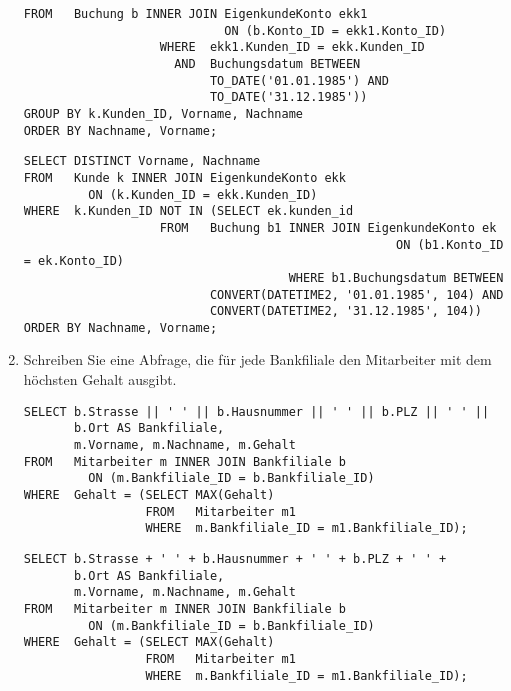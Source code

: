 \begin{enumerate}
\begin{lstlisting}[language=oracle_sql]
                   FROM   Buchung b INNER JOIN EigenkundeKonto ekk1
                            ON (b.Konto_ID = ekk1.Konto_ID)
                   WHERE  ekk1.Kunden_ID = ekk.Kunden_ID
                     AND  Buchungsdatum BETWEEN
                          TO_DATE('01.01.1985') AND
                          TO_DATE('31.12.1985'))
GROUP BY k.Kunden_ID, Vorname, Nachname
ORDER BY Nachname, Vorname;
        \end{lstlisting}
\clearpage
        \begin{mssql}[\FALSE]
        \end{mssql}
        \begin{lstlisting}[language=ms_sql]
SELECT DISTINCT Vorname, Nachname
FROM   Kunde k INNER JOIN EigenkundeKonto ekk
         ON (k.Kunden_ID = ekk.Kunden_ID)
WHERE  k.Kunden_ID NOT IN (SELECT ek.kunden_id
                   FROM   Buchung b1 INNER JOIN EigenkundeKonto ek
													ON (b1.Konto_ID = ek.Konto_ID)
									 WHERE b1.Buchungsdatum BETWEEN
                          CONVERT(DATETIME2, '01.01.1985', 104) AND
                          CONVERT(DATETIME2, '31.12.1985', 104))
ORDER BY Nachname, Vorname;
        \end{lstlisting}
        \item Schreiben Sie eine Abfrage, die f\"ur jede Bankfiliale den
        Mitarbeiter mit dem h\"ochsten Gehalt ausgibt.
        \begin{oraclesql}[\FALSE]
        \end{oraclesql}
        \begin{lstlisting}[language=oracle_sql]
SELECT b.Strasse || ' ' || b.Hausnummer || ' ' || b.PLZ || ' ' ||
       b.Ort AS Bankfiliale,
       m.Vorname, m.Nachname, m.Gehalt
FROM   Mitarbeiter m INNER JOIN Bankfiliale b
         ON (m.Bankfiliale_ID = b.Bankfiliale_ID)
WHERE  Gehalt = (SELECT MAX(Gehalt)
                 FROM   Mitarbeiter m1
                 WHERE  m.Bankfiliale_ID = m1.Bankfiliale_ID);
        \end{lstlisting}
        \begin{mssql}[\FALSE]
        \end{mssql}
        \begin{lstlisting}[language=ms_sql]
SELECT b.Strasse + ' ' + b.Hausnummer + ' ' + b.PLZ + ' ' +
       b.Ort AS Bankfiliale,
       m.Vorname, m.Nachname, m.Gehalt
FROM   Mitarbeiter m INNER JOIN Bankfiliale b
         ON (m.Bankfiliale_ID = b.Bankfiliale_ID)
WHERE  Gehalt = (SELECT MAX(Gehalt)
                 FROM   Mitarbeiter m1
                 WHERE  m.Bankfiliale_ID = m1.Bankfiliale_ID);

\end{lstlisting}
\end{enumerate}
